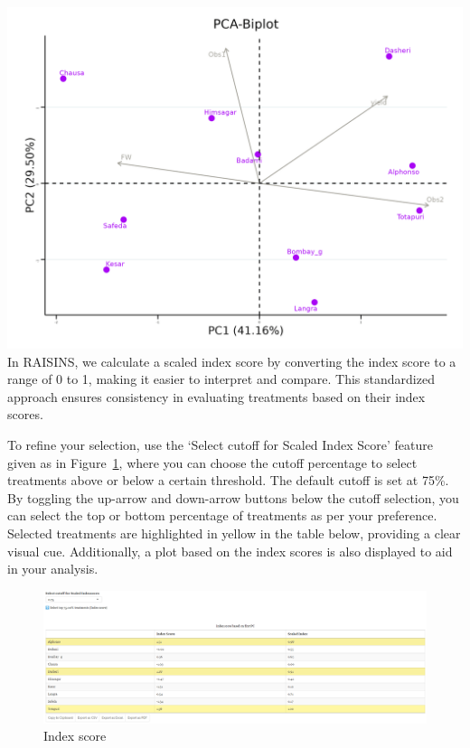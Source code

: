 \documentclass[
  letterpaper,
  DIV=11,
  numbers=noendperiod]{scrartcl}
\begin{document}
\includegraphics{BiplotPCA2025-10-07.webp} In RAISINS, we calculate a
scaled index score by converting the index score to a range of 0 to 1,
making it easier to interpret and compare. This standardized approach
ensures consistency in evaluating treatments based on their index
scores.

To refine your selection, use the `Select cutoff for Scaled Index Score'
feature given as in Figure~\ref{fig-indexscore}, where you can choose
the cutoff percentage to select treatments above or below a certain
threshold. The default cutoff is set at 75\%. By toggling the up-arrow
and down-arrow buttons below the cutoff selection, you can select the
top or bottom percentage of treatments as per your preference. Selected
treatments are highlighted in yellow in the table below, providing a
clear visual cue. Additionally, a plot based on the index scores is also
displayed to aid in your analysis.

\begin{figure}

{\centering \includegraphics{MAN5.webp}

}

\caption{\label{fig-indexscore}Index score}

\end{figure}
\end{document}
